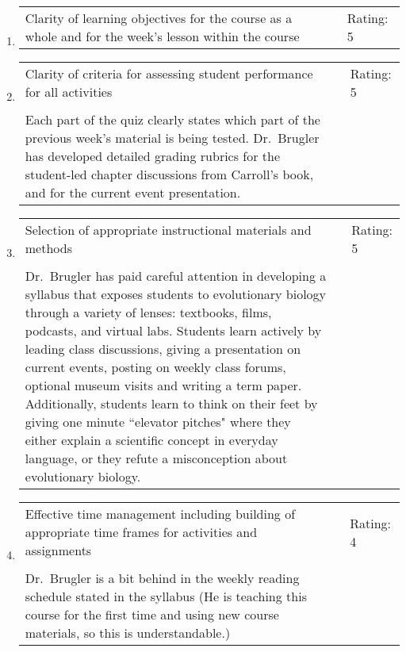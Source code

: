 \documentclass[11pt,dvipsnames]{article}
\begin{document}
\begin{enumerate}[label= {\bf  \arabic*:}]
	
	\item 	\begin{tabular}[t]{p{} p{2cm} p{2cm} }
		Clarity of learning objectives for the course as a whole and for the week's lesson within the course & & Rating: 5 
	\end{tabular} 
	\item 	\begin{tabular}[t]{p{} p{2cm} p{2cm} }
		Clarity of criteria for assessing student performance for all activities & & Rating: 5\\
		& & \\
		Each part of the quiz clearly states which part of the previous week's material is being tested. Dr.~Brugler has developed detailed grading rubrics for the student-led chapter discussions from Carroll's book, and for the current event presentation. &  & \\
		\end{tabular} 
    \item 	\begin{tabular}[t]{p{} p{2cm} p{2cm} }
	Selection of appropriate instructional materials and methods & & Rating: 5 \\
	& &\\
	Dr.~Brugler has paid careful attention in developing a syllabus that exposes students to evolutionary biology through a variety of lenses: textbooks, films, podcasts, and virtual labs. Students learn actively by leading class discussions, giving a presentation on current events, posting on weekly class forums, optional museum visits and writing a term paper. Additionally, students learn to think on their feet by giving one minute ``elevator pitches" where they either explain a scientific concept in everyday language, or they refute a misconception about evolutionary biology. & &\\
\end{tabular} 
\item 	\begin{tabular}[t]{p{} p{2cm} p{2cm} }
	Effective time management including building of appropriate
	time frames for activities and assignments & & Rating: 4 \\
	& &\\
	Dr.~Brugler is a bit behind in the weekly reading schedule stated in the syllabus (He is teaching this course for the first time and using new course materials, so this is understandable.) & & \\
\end{tabular}

\end{enumerate}
\end{document}
